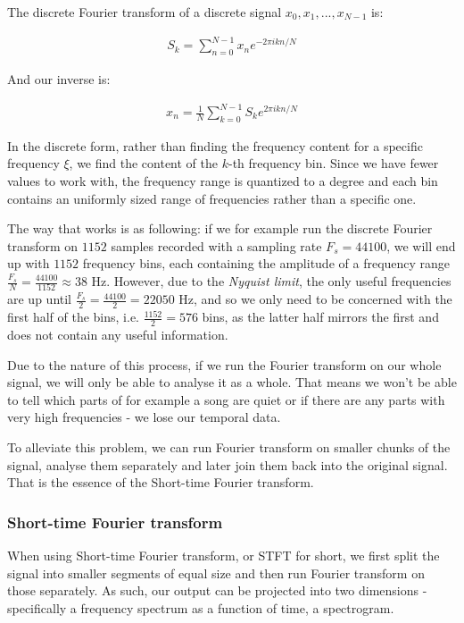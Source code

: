 The discrete Fourier transform of a discrete signal $x_0, x_1, ..., x_{N-1}$ is: \cite{Recoskie2014ConstrainedNM}

\begin{align}
S_k = \sum_{n=0}^{N-1}x_ne^{-2\pi ikn/N}
\end{align}

And our inverse is:

\begin{align}
x_n = \frac1N \sum_{k=0}^{N-1}S_ke^{2\pi ikn/N}
\end{align}

In the discrete form, rather than finding the frequency content for a specific frequency $\xi$, we find the content of the $k$-th frequency bin. Since we have fewer values to work with, the frequency range is quantized to a degree and each bin contains an uniformly sized range of frequencies rather than a specific one.

The way that works is as following: if we for example run the discrete Fourier transform on $1152$ samples recorded with a sampling rate $F_s = 44100$, we will end up with $1152$ frequency bins, each containing the amplitude of a frequency range $\frac{F_s}{N} = \frac{44100}{1152} \approx 38$ Hz. However, due to the \emph{Nyquist limit}, the only useful frequencies are up until $\frac{F_s}{2} = \frac{44100}{2} = 22050$ Hz, and so we only need to be concerned with the first half of the bins, i.e. $\frac{1152}{2} = 576$ bins, as the latter half mirrors the first and does not contain any useful information.

Due to the nature of this process, if we run the Fourier transform on our whole signal, we will only be able to analyse it as a whole. That means we won't be able to tell which parts of for example a song are quiet or if there are any parts with very high frequencies - we lose our temporal data.

To alleviate this problem, we can run Fourier transform on smaller chunks of the signal, analyse them separately and later join them back into the original signal. That is the essence of the Short-time Fourier transform.

\subsubsection{Short-time Fourier transform}
When using Short-time Fourier transform, or STFT for short, we first split the signal into smaller segments of equal size and then run Fourier transform on those separately. As such, our output can be projected into two dimensions - specifically a frequency spectrum as a function of time, a spectrogram.

